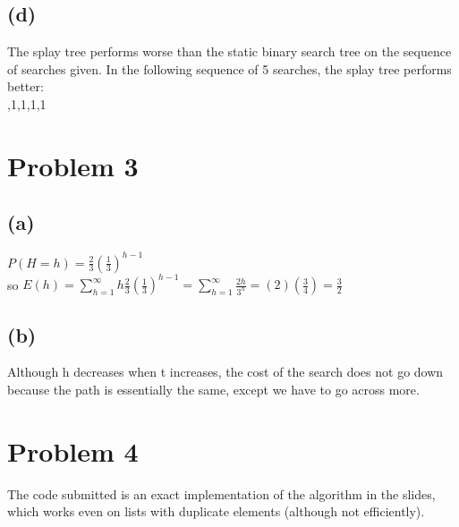 \documentclass{article}[12pt]
\begin{document}
\subsection*{(d)}
The splay tree performs worse than the static binary search tree on the sequence of searches given. In the following sequence of 5 searches, the splay tree performs better: \\
,1,1,1,1 \\


\section*{Problem 3}
\subsection*{(a)}
$P(H=h) = \frac{2}{3}(\frac{1}{3})^{h-1}$ \\ 
so $E(h) = \sum_{h=1}^{\infty}h\frac{2}{3}(\frac{1}{3})^{h-1} = \sum_{h=1}^{\infty}\frac{2h}{3^{h}} = (2)(\frac{3}{4}) = \frac{3}{2}$ \\

\subsection*{(b)}
Although h decreases when t increases, the cost of the search does not go down because the path is essentially the same, except we have to go across more. \\

\section*{Problem 4}
The code submitted is an exact implementation of the algorithm in the slides, which works even on lists with duplicate elements (although not efficiently). \\
\end{document}
